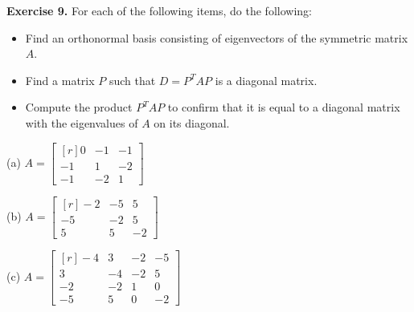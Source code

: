 \documentclass[12pt]{article}
\begin{document}
\bigskip
\textbf{Exercise 9.} For each of the following items, do the following:
\begin{itemize}
\item Find an orthonormal basis consisting of eigenvectors of the symmetric matrix $A$.
\item Find a matrix $P$ such that $D=P^TAP$ is a diagonal matrix.
\item Compute the product $P^TAP$ to confirm that it is equal to a diagonal matrix with the eigenvalues of $A$ on its diagonal.
\end{itemize}

\medskip
(a)
$A=\left[\begin{matrix*}[r]0 & -1 & -1\\-1 & 1 & -2\\-1 & -2 & 1\end{matrix*}\right]$

\medskip
(b)
$A=\left[\begin{matrix*}[r]-2 & -5 & 5\\-5 & -2 & 5\\5 & 5 & -2\end{matrix*}\right]$

\medskip
(c)
$A=\left[\begin{matrix*}[r]-4 & 3 & -2 & -5\\3 & -4 & -2 & 5\\-2 & -2 & 1 & 0\\-5 & 5 & 0 & -2\end{matrix*}\right]$



\end{document}
